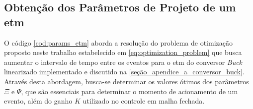 \subsection{Obtenção dos Parâmetros de Projeto de um \acrshort{etm}}


O código \ref{cod:params_etm} aborda a resolução do problema de otimização proposto neste trabalho estabelecido em \eqref{eq:optimization_problem} que busca aumentar o intervalo de tempo entre os eventos para o \acrshort{etm} do conversor \textit{Buck} linearizado implementado e discutido na \autoref{seção_apendice_a_conversor_buck}. Através desta abordagem, busca-se determinar os valores ótimos dos parâmetros $\Xi$ e $\Psi$, que são essenciais para determinar o momento de acionamento de um evento, além do ganho $K$ utilizado no controle em malha fechada.

